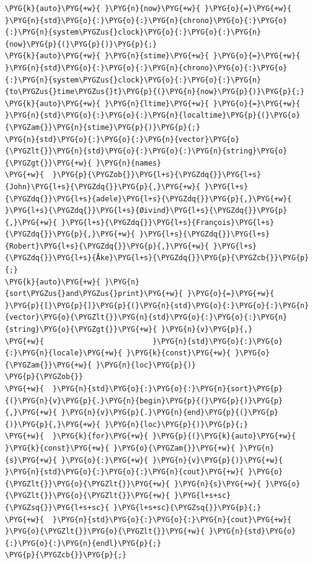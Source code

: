 \begin{codeblockbg}
\begin{Verbatim}[commandchars=\\\{\},breaklines=true,breakanywhere=true,fontsize=\codefont,xleftmargin=17bp]
\PYG{k}{auto}\PYG{+w}{ }\PYG{n}{now}\PYG{+w}{ }\PYG{o}{=}\PYG{+w}{ }\PYG{n}{std}\PYG{o}{:}\PYG{o}{:}\PYG{n}{chrono}\PYG{o}{:}\PYG{o}{:}\PYG{n}{system\PYGZus{}clock}\PYG{o}{:}\PYG{o}{:}\PYG{n}{now}\PYG{p}{(}\PYG{p}{)}\PYG{p}{;}
\PYG{k}{auto}\PYG{+w}{ }\PYG{n}{stime}\PYG{+w}{ }\PYG{o}{=}\PYG{+w}{ }\PYG{n}{std}\PYG{o}{:}\PYG{o}{:}\PYG{n}{chrono}\PYG{o}{:}\PYG{o}{:}\PYG{n}{system\PYGZus{}clock}\PYG{o}{:}\PYG{o}{:}\PYG{n}{to\PYGZus{}time\PYGZus{}t}\PYG{p}{(}\PYG{n}{now}\PYG{p}{)}\PYG{p}{;}
\PYG{k}{auto}\PYG{+w}{ }\PYG{n}{ltime}\PYG{+w}{ }\PYG{o}{=}\PYG{+w}{ }\PYG{n}{std}\PYG{o}{:}\PYG{o}{:}\PYG{n}{localtime}\PYG{p}{(}\PYG{o}{\PYGZam{}}\PYG{n}{stime}\PYG{p}{)}\PYG{p}{;}
\PYG{n}{std}\PYG{o}{:}\PYG{o}{:}\PYG{n}{vector}\PYG{o}{\PYGZlt{}}\PYG{n}{std}\PYG{o}{:}\PYG{o}{:}\PYG{n}{string}\PYG{o}{\PYGZgt{}}\PYG{+w}{ }\PYG{n}{names}
\PYG{+w}{  }\PYG{p}{\PYGZob{}}\PYG{l+s}{\PYGZdq{}}\PYG{l+s}{John}\PYG{l+s}{\PYGZdq{}}\PYG{p}{,}\PYG{+w}{ }\PYG{l+s}{\PYGZdq{}}\PYG{l+s}{adele}\PYG{l+s}{\PYGZdq{}}\PYG{p}{,}\PYG{+w}{ }\PYG{l+s}{\PYGZdq{}}\PYG{l+s}{Øivind}\PYG{l+s}{\PYGZdq{}}\PYG{p}{,}\PYG{+w}{ }\PYG{l+s}{\PYGZdq{}}\PYG{l+s}{François}\PYG{l+s}{\PYGZdq{}}\PYG{p}{,}\PYG{+w}{ }\PYG{l+s}{\PYGZdq{}}\PYG{l+s}{Robert}\PYG{l+s}{\PYGZdq{}}\PYG{p}{,}\PYG{+w}{ }\PYG{l+s}{\PYGZdq{}}\PYG{l+s}{Åke}\PYG{l+s}{\PYGZdq{}}\PYG{p}{\PYGZcb{}}\PYG{p}{;}
\PYG{k}{auto}\PYG{+w}{ }\PYG{n}{sort\PYGZus{}and\PYGZus{}print}\PYG{+w}{ }\PYG{o}{=}\PYG{+w}{ }\PYG{p}{[}\PYG{p}{]}\PYG{p}{(}\PYG{n}{std}\PYG{o}{:}\PYG{o}{:}\PYG{n}{vector}\PYG{o}{\PYGZlt{}}\PYG{n}{std}\PYG{o}{:}\PYG{o}{:}\PYG{n}{string}\PYG{o}{\PYGZgt{}}\PYG{+w}{ }\PYG{n}{v}\PYG{p}{,}
\PYG{+w}{                         }\PYG{n}{std}\PYG{o}{:}\PYG{o}{:}\PYG{n}{locale}\PYG{+w}{ }\PYG{k}{const}\PYG{+w}{ }\PYG{o}{\PYGZam{}}\PYG{+w}{ }\PYG{n}{loc}\PYG{p}{)}
\PYG{p}{\PYGZob{}}
\PYG{+w}{  }\PYG{n}{std}\PYG{o}{:}\PYG{o}{:}\PYG{n}{sort}\PYG{p}{(}\PYG{n}{v}\PYG{p}{.}\PYG{n}{begin}\PYG{p}{(}\PYG{p}{)}\PYG{p}{,}\PYG{+w}{ }\PYG{n}{v}\PYG{p}{.}\PYG{n}{end}\PYG{p}{(}\PYG{p}{)}\PYG{p}{,}\PYG{+w}{ }\PYG{n}{loc}\PYG{p}{)}\PYG{p}{;}
\PYG{+w}{  }\PYG{k}{for}\PYG{+w}{ }\PYG{p}{(}\PYG{k}{auto}\PYG{+w}{ }\PYG{k}{const}\PYG{+w}{ }\PYG{o}{\PYGZam{}}\PYG{+w}{ }\PYG{n}{s}\PYG{+w}{ }\PYG{o}{:}\PYG{+w}{ }\PYG{n}{v}\PYG{p}{)}\PYG{+w}{ }\PYG{n}{std}\PYG{o}{:}\PYG{o}{:}\PYG{n}{cout}\PYG{+w}{ }\PYG{o}{\PYGZlt{}}\PYG{o}{\PYGZlt{}}\PYG{+w}{ }\PYG{n}{s}\PYG{+w}{ }\PYG{o}{\PYGZlt{}}\PYG{o}{\PYGZlt{}}\PYG{+w}{ }\PYG{l+s+sc}{\PYGZsq{}}\PYG{l+s+sc}{ }\PYG{l+s+sc}{\PYGZsq{}}\PYG{p}{;}
\PYG{+w}{  }\PYG{n}{std}\PYG{o}{:}\PYG{o}{:}\PYG{n}{cout}\PYG{+w}{ }\PYG{o}{\PYGZlt{}}\PYG{o}{\PYGZlt{}}\PYG{+w}{ }\PYG{n}{std}\PYG{o}{:}\PYG{o}{:}\PYG{n}{endl}\PYG{p}{;}
\PYG{p}{\PYGZcb{}}\PYG{p}{;}
\end{Verbatim}
\end{codeblockbg}


